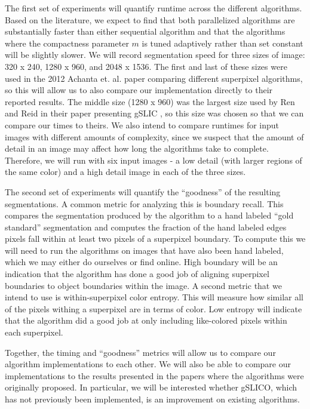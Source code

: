 \documentclass[11pt]{article}
\begin{document}
The first set of experiments will quantify runtime across the different algorithms. Based on the literature, we expect to find that both parallelized algorithms are substantially faster than either sequential algorithm and that the algorithms where the compactness parameter $m$ is tuned adaptively rather than set constant will be slightly slower. We will record segmentation speed for three sizes of image: 320 x 240, 1280 x 960, and 2048 x 1536. The first and last of these sizes were used in the 2012 Achanta et. al. \cite{slic2012} paper comparing different superpixel algorithms, so this will allow us to also compare our implementation directly to their reported results. The middle size (1280 x 960) was the largest size used by Ren and Reid in their paper presenting gSLIC \cite{gslic}, so this size was chosen so that we can compare our times to theirs. We also intend to compare runtimes for input images with different amounts of complexity, since we suspect that the amount of detail in an image may affect how long the algorithms take to complete. Therefore, we will run with six input images - a low detail (with larger regions of the same color) and a high detail image in each of the three sizes.

The second set of experiments will quantify the ``goodness'' of the resulting segmentations. A common metric for analyzing this is boundary recall\cite{dissertationneubert}. This compares the segmentation produced by the algorithm to a hand labeled ``gold standard'' segmentation and computes the fraction of the hand labeled edges pixels fall within at least two pixels of a superpixel boundary. To compute this we will need to run the algorithms on images that have also been hand labeled, which we may either do ourselves or find online. High boundary will be an indication that the algorithm has done a good job of aligning superpixel boundaries to object boundaries within the image. A second metric that we intend to use is within-superpixel color entropy. This will measure how similar all of the pixels withing a superpixel are in terms of color. Low entropy will indicate that the algorithm did a good job at only including like-colored pixels within each superpixel.

Together, the timing and ``goodness'' metrics will allow us to compare our algorithm implementations to each other. We will also be able to compare our implementations to the results presented in the papers where the algorithms were originally proposed. In particular, we will be interested whether gSLICO, which has not previously been implemented, is an improvement on existing algorithms.
\end{document}
